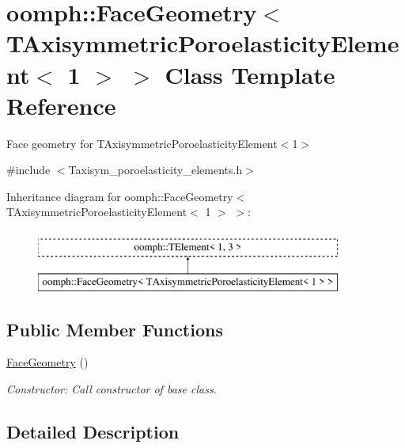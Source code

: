 \hypertarget{classoomph_1_1FaceGeometry_3_01TAxisymmetricPoroelasticityElement_3_011_01_4_01_4}{}\section{oomph\+:\+:Face\+Geometry$<$ T\+Axisymmetric\+Poroelasticity\+Element$<$ 1 $>$ $>$ Class Template Reference}
\label{classoomph_1_1FaceGeometry_3_01TAxisymmetricPoroelasticityElement_3_011_01_4_01_4}


Face geometry for T\+Axisymmetric\+Poroelasticity\+Element$<$1$>$  




{\ttfamily \#include $<$Taxisym\+\_\+poroelasticity\+\_\+elements.\+h$>$}

Inheritance diagram for oomph\+:\+:Face\+Geometry$<$ T\+Axisymmetric\+Poroelasticity\+Element$<$ 1 $>$ $>$\+:\begin{figure}[H]
\begin{center}
\leavevmode
\includegraphics[height=2.000000cm]{classoomph_1_1FaceGeometry_3_01TAxisymmetricPoroelasticityElement_3_011_01_4_01_4}
\end{center}
\end{figure}
\subsection*{Public Member Functions}
\begin{DoxyCompactItemize}
\item 
\hyperlink{classoomph_1_1FaceGeometry_3_01TAxisymmetricPoroelasticityElement_3_011_01_4_01_4_a22a8c74da05d35900496807374b292ad}{Face\+Geometry} ()
\begin{DoxyCompactList}\small\item\em Constructor\+: Call constructor of base class. \end{DoxyCompactList}\end{DoxyCompactItemize}


\subsection{Detailed Description}
